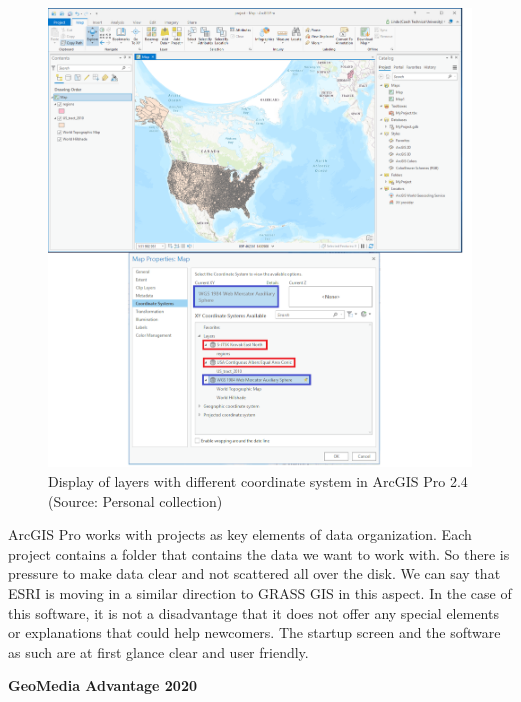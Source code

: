 \documentclass[a4paper,10pt,twoside]{article}
\begin{document}
\newpage
\begin{figure}[hbt!] 
\begin{center}
\includegraphics[width=16cm]{../pictures/arcgis_pro_onthefly2.png} 
\caption[Display of layers with different coordinate system in ArcGIS Pro 2.4]{Display of layers with different coordinate system in ArcGIS Pro 2.4 (Source: Personal collection)}
\label{fig:arcgis_pro_onthefly2}
\end{center}
\end{figure}

\noindent ArcGIS Pro works with projects as key elements of data organization. Each project contains a folder that contains the data we want to work with. So there is pressure to make data clear and not scattered all over the disk. We can say that ESRI is moving in a similar direction to GRASS GIS in this aspect. In the case of this software, it is not a disadvantage that it does not offer any special elements or explanations that could help newcomers. The startup screen and the software as such are at first glance clear and user friendly.

\newpage
\vspace*{-1cm}
\bigskip
\noindent \textbf {GeoMedia Advantage 2020}
\end{document}
